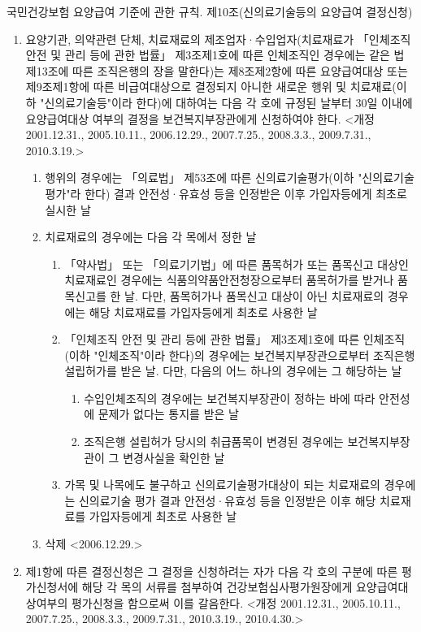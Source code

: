 국민건강보험 요양급여 기준에 관한 규칙.
제10조(신의료기술등의 요양급여 결정신청)
\begin{enumerate}[①]\tightlist
\item 요양기관, 의약관련 단체, 치료재료의 제조업자·수입업자(치료재료가 「인체조직 안전 및 관리 등에 관한 법률」 제3조제1호에 따른 인체조직인 경우에는 같은 법 제13조에 따른 조직은행의 장을 말한다)는 제8조제2항에 따른 요양급여대상 또는 제9조제1항에 따른 비급여대상으로 결정되지 아니한 새로운 행위 및 치료재료(이하 "신의료기술등"이라 한다)에 대하여는 다음 각 호에 규정된 날부터 30일 이내에 요양급여대상 여부의 결정을 보건복지부장관에게 신청하여야 한다.  <개정 2001.12.31., 2005.10.11., 2006.12.29., 2007.7.25., 2008.3.3., 2009.7.31., 2010.3.19.>
	\begin{enumerate}[1.]\tightlist
	\item 행위의 경우에는 「의료법」 제53조에 따른 신의료기술평가(이하 "신의료기술평가"라 한다) 결과 안전성·유효성 등을 인정받은 이후 가입자등에게 최초로 실시한 날
	\item 치료재료의 경우에는 다음 각 목에서 정한 날
		\begin{enumerate}[가.]\tightlist
		\item 「약사법」 또는 「의료기기법」에 따른 품목허가 또는 품목신고 대상인 치료재료인 경우에는 식품의약품안전청장으로부터 품목허가를 받거나 품목신고를 한 날. 다만, 품목허가나 품목신고 대상이 아닌 치료재료의 경우에는 해당 치료재료를 가입자등에게 최초로 사용한 날
		\item 「인체조직 안전 및 관리 등에 관한 법률」 제3조제1호에 따른 인체조직(이하 "인체조직"이라 한다)의 경우에는 보건복지부장관으로부터 조직은행 설립허가를 받은 날. 다만, 다음의 어느 하나의 경우에는 그 해당하는 날
			\begin{enumerate}[1)]\tightlist
			\item  수입인체조직의 경우에는 보건복지부장관이 정하는 바에 따라 안전성에 문제가 없다는 통지를 받은 날
			\item  조직은행 설립허가 당시의 취급품목이 변경된 경우에는 보건복지부장관이 그 변경사실을 확인한 날
			\end{enumerate}
		\item 가목 및 나목에도 불구하고 신의료기술평가대상이 되는 치료재료의 경우에는 신의료기술 평가 결과 안전성·유효성 등을 인정받은 이후 해당 치료재료를 가입자등에게 최초로 사용한 날
		\end{enumerate}
	\item 삭제  <2006.12.29.>
	\end{enumerate}
\item 제1항에 따른 결정신청은 그 결정을 신청하려는 자가 다음 각 호의 구분에 따른 평가신청서에 해당 각 목의 서류를 첨부하여 건강보험심사평가원장에게 요양급여대상여부의 평가신청을 함으로써 이를 갈음한다.  <개정 2001.12.31., 2005.10.11., 2007.7.25., 2008.3.3., 2009.7.31., 2010.3.19., 2010.4.30.>

\end{enumerate}

